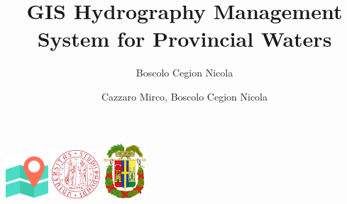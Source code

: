 \documentclass[a4paper, 11pt]{article}
\title{GIS Hydrography Management System for Provincial Waters}
\author{Boscolo Cegion Nicola}
\author{Cazzaro Mirco, Boscolo Cegion Nicola}
\date{}
\begin{document}
\maketitle
\begin{center}
    \includegraphics[width = 16mm]{img/map.png}
    \hspace{10mm}
    \includegraphics[width = 18mm]{img/unipd.png}
    \hspace{10mm}
    \includegraphics[width = 16mm]{img/belluno.png}
\end{center}
\tableofcontents







\end{document}
